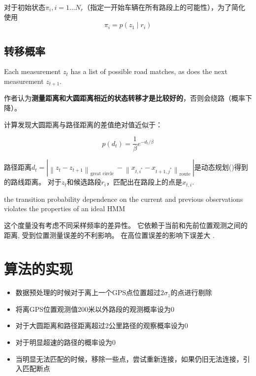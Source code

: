 对于初始状态$ \pi_{i} ,i=1 \ldots N_{r} $（指定一开始车辆在所有路段上的可能性），为了简化使用$$ \pi_{i}=p\left(z_{1} \mid r_{i}\right) $$

\subsection{转移概率}

Each measurement $ z_{t} $ has a list of possible road matches, as does the next measurement $ z_{t+1} $. 

作者认为\textbf{测量距离和大圆距离相近的状态转移才是比较好的}，否则会绕路（概率下降）。 

计算发现大圆距离与路径距离的差值绝对值近似于：

$$ p\left(d_{t}\right)=\frac{1}{\beta} e^{-d_{t} / \beta} $$

路径距离$ d_{t}=\left| \left\|z_{t}-z_{t+1}\right\|_{\text {great circle }}-\left\|x_{t, i^{*}}-x_{t+1, j^{*}}\right\|_{\text {route }}\right| $是动态规划()得到的路线距离。 对于$z_t$和候选路段$r_i$，匹配出在路段上的点是$ x_{t, i} $. 

\begin{remark}
      \label{Comment:HMM-TransitionProbability}

      the transition probability
        dependence on the current and previous observations
    violates the properties of an ideal HMM

    这个度量没有考虑不同采样频率的差异性。 它依赖于当前和先前位置观测之间的距离, 受到位置测量误差的不利影响。 在高位置误差的影响下误差大 \cite{Jagadeesh2017}.
\end{remark}

\section{算法的实现}

\begin{itemize}
    \item 数据预处理的时候对于离上一个GPS点位置超过$ 2 \sigma_{z} $的点进行剔除
    \item 将离GPS位置观测值200米以外路段的观测概率设为0
    \item 对于大圆距离和路径距离超过2公里路径的观察概率设为0
    \item 对于明显超速的路径的概率设为0
    \item 当明显无法匹配的时候，移除一些点，尝试重新连接，如果仍旧无法连接，引入匹配断点
\end{itemize}

